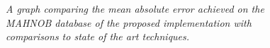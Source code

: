 \begin{figure}
    \centering
    \scalebox{0.7}{}
   \caption{\textit{A graph comparing the mean absolute error achieved on the MAHNOB database of the proposed implementation with comparisons to state of the art techniques.}}
\end{figure}

